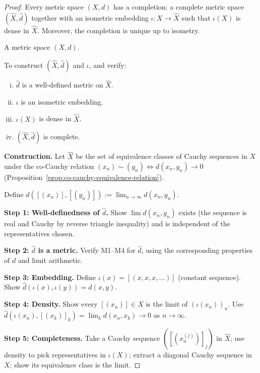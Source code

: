 \begin{proof}
\Claim Every metric space $(X,d)$ has a completion: a complete metric space
$(\hat{X}, \hat{d})$ together with an isometric embedding $\iota : X \to \hat{X}$
such that $\iota(X)$ is dense in $\hat{X}$.
Moreover, the completion is unique up to isometry.

\Given A metric space $(X,d)$.

\Goal To construct $(\hat{X}, \hat{d})$ and $\iota$, and verify:
\begin{enumerate}[(i)]
  \item $\hat{d}$ is a well-defined metric on $\hat{X}$.
  \item $\iota$ is an isometric embedding.
  \item $\iota(X)$ is dense in $\hat{X}$.
  \item $(\hat{X}, \hat{d})$ is complete.
\end{enumerate}

\Strategy

\noindent\textbf{Construction.}
Let $\hat{X}$ be the set of equivalence classes of Cauchy sequences in $X$
under the co-Cauchy relation $(x_n) \sim (y_n) \iff d(x_n, y_n) \to 0$
(Proposition~\ref{prop:co-cauchy-equivalence-relation}).

Define $\hat{d}([(x_n)], [(y_n)]) := \lim_{n \to \infty} d(x_n, y_n)$.

\noindent\textbf{Step 1: Well-definedness of $\hat{d}$.}
Show $\lim d(x_n, y_n)$ exists (the sequence is real and Cauchy by reverse
triangle inequality) and is independent of the representatives chosen.

\noindent\textbf{Step 2: $\hat{d}$ is a metric.}
Verify M1--M4 for $\hat{d}$, using the corresponding properties of $d$
and limit arithmetic.

\noindent\textbf{Step 3: Embedding.}
Define $\iota(x) = [(x, x, x, \ldots)]$ (constant sequence).
Show $\hat{d}(\iota(x), \iota(y)) = d(x,y)$.

\noindent\textbf{Step 4: Density.}
Show every $[(x_n)] \in \hat{X}$ is the limit of $(\iota(x_n))_{n}$.
Use $\hat{d}(\iota(x_n), [(x_k)]_k) = \lim_k d(x_n, x_k) \to 0$ as $n \to \infty$.

\noindent\textbf{Step 5: Completeness.}
Take a Cauchy sequence $([(x_n^{(j)})]_j)$ in $\hat{X}$;
use density to pick representatives in $\iota(X)$;
extract a diagonal Cauchy sequence in $X$;
show its equivalence class is the limit.


\end{proof}

